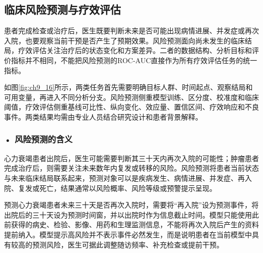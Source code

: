 \par
\noindent\begin{minipage}{\textwidth}
\centering
{}
\label{fig:ch9_15}
\end{minipage}
\par


\subsection{临床风险预测与疗效评估}

患者完成检查或治疗后，医生既要判断未来是否可能出现病情进展、并发症或再次入院，也要观察当前干预是否产生了预期效果。风险预测面向尚未发生的临床结局，疗效评估关注治疗后的状态变化和方案差异。二者的数据结构、分析目标和评价指标并不相同，不能把风险预测的ROC-AUC直接作为所有疗效评估任务的统一指标。

如图\ref{fig:ch9_16}所示，两类任务首先需要明确目标人群、时间起点、观察结局和可用变量，再进入不同分析分支。风险预测侧重模型训练、区分度、校准度和临床阈值，疗效评估侧重基线可比性、纵向变化、效应量、置信区间、疗效响应和不良事件。两类结果均需由专业人员结合研究设计和患者背景解释。

\par
\noindent\begin{minipage}{\textwidth}
\centering
{}
\label{fig:ch9_16}
\end{minipage}
\par

\subsubsection*{\textbf{• 风险预测的含义}}

心力衰竭患者出院后，医生可能需要判断其三十天内再次入院的可能性；肿瘤患者完成治疗后，则需要关注未来数年内复发或转移的风险。风险预测将患者当前状态与未来临床结局联系起来，预测对象可以是疾病发生、病情进展、并发症、再入院、复发或死亡，结果通常以风险概率、风险等级或预警提示呈现。

预测心力衰竭患者未来三十天是否再次入院时，需要将“再入院”设为预测事件，将出院后的三十天设为预测时间窗，并以出院时作为信息截止时间。模型只能使用此前获得的病史、检验、影像、用药和生理监测信息，不能将再次入院后产生的资料提前纳入。模型提示高风险并不表示事件必然发生，而是说明患者在当前模型中具有较高的预测风险，医生可据此调整随访频率、补充检查或提前干预。


